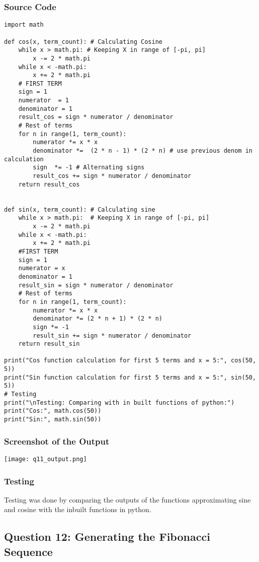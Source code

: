\documentclass{article}
\begin{document}
\subsubsection*{Source Code}
\begin{lstlisting}
import math

def cos(x, term_count): # Calculating Cosine
    while x > math.pi: # Keeping X in range of [-pi, pi]
        x -= 2 * math.pi
    while x < -math.pi:
        x += 2 * math.pi
    # FIRST TERM
    sign = 1
    numerator  = 1
    denominator = 1
    result_cos = sign * numerator / denominator
    # Rest of terms
    for n in range(1, term_count):
        numerator *= x * x
        denominator *=  (2 * n - 1) * (2 * n) # use previous denom in calculation
        sign  *= -1 # Alternating signs
        result_cos += sign * numerator / denominator
    return result_cos


def sin(x, term_count): # Calculating sine
    while x > math.pi:  # Keeping X in range of [-pi, pi]
        x -= 2 * math.pi
    while x < -math.pi:
        x += 2 * math.pi
    #FIRST TERM
    sign = 1
    numerator = x
    denominator = 1
    result_sin = sign * numerator / denominator
    # Rest of terms
    for n in range(1, term_count):
        numerator *= x * x
        denominator *= (2 * n + 1) * (2 * n)
        sign *= -1
        result_sin += sign * numerator / denominator
    return result_sin

print("Cos function calculation for first 5 terms and x = 5:", cos(50, 5))
print("Sin function calculation for first 5 terms and x = 5:", sin(50, 5))
# Testing
print("\nTesting: Comparing with in built functions of python:")
print("Cos:", math.cos(50))
print("Sin:", math.sin(50))
\end{lstlisting}

\subsubsection*{Screenshot of the Output}
\texttt{[image: q11\_output.png]}

\subsubsection*{Testing}
Testing was done by comparing the outputs of the functions approximating sine and cosine with the inbuilt functions in python.

\subsection*{Question 12: Generating the Fibonacci Sequence}
\end{document}
